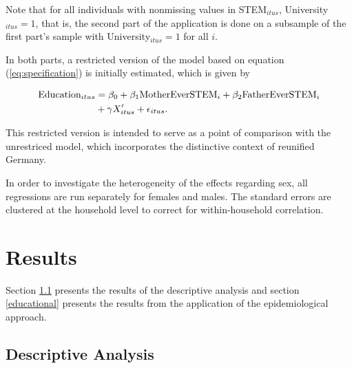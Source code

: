 \documentclass[a4paper, oneside, hyperfootnotes = false]{article}
\begin{document}
{Note that for all individuals with nonmissing values in STEM$_{itus}$, University$_{itus} = 1$, that is, the second part of the application is done on a subsample of the first part's sample with University$_{itus} = 1$ for all $i$.

In both parts, a restricted version of the model based on equation (\ref{eq:specification}) is initially estimated, which is given by

\vspace{-8mm}

\begin{equation}
	\begin{split}
		\label{eq:specificationrestr}
		\textnormal{Education}_{itus} &={} \beta_{0} + \beta_{1}\textnormal{MotherEverSTEM}_{i} + \beta_{2}\textnormal{FatherEverSTEM}_{i} \\
		& + \gamma{}X'_{itus} + \epsilon_{itus}\textnormal{.}
	\end{split}
\end{equation}

This restricted version is intended to serve as a point of comparison with the unrestriced model, which incorporates the distinctive context of reunified Germany.

In order to investigate the heterogeneity of the effects regarding sex, all regressions are run separately for females and males.
The standard errors are clustered at the household level to correct for within-household correlation.

\section{Results}
\label{results}

Section \ref{descriptives} presents the results of the descriptive analysis and section \ref{educational} presents the results from the application of the epidemiological approach.

\subsection{Descriptive Analysis}
\label{descriptives}

}
\end{document}
